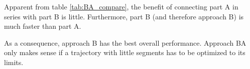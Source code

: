Apparent from table \ref{tab:BA_compare}, the benefit of connecting part A in series with part B is little. Furthermore, part B (and therefore approach B) is much faster than part A. \newline

As a consequence, approach B has the best overall performance. Approach BA only makes sense if a trajectory with little segments has to be optimized to its  limits.

















